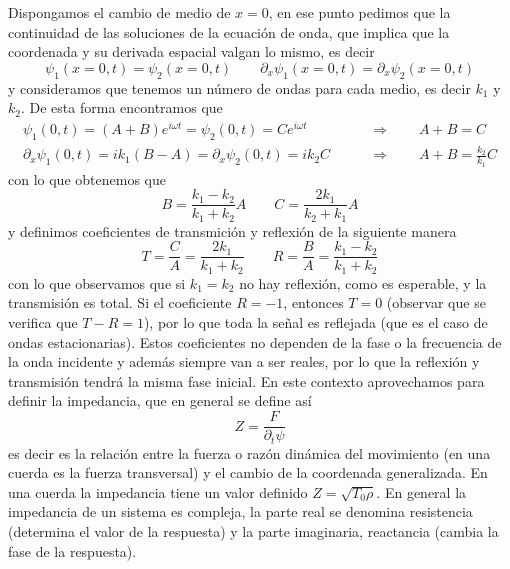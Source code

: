 \documentclass[a4paper]{article}
\numberwithin{equation}{section}
\begin{document}
			Dispongamos el cambio de medio de $x = 0$, en ese punto pedimos que la continuidad de las soluciones de la ecuación de onda, que implica que la coordenada y su derivada espacial valgan lo mismo, es decir
			\begin{equation*}
				\psi_1(x = 0,t) = \psi_2(x = 0,t) \qquad \partial_x \psi_1(x = 0,t) = \partial_x \psi_2(x = 0, t)
			\end{equation*}
			y consideramos que tenemos un número de ondas para cada medio, es decir $k_1$ y $k_2$. De esta forma encontramos que
			\begin{align*}
				\psi_1(0,t) = (A + B) e^{i\omega t} = \psi_2(0,t) = C e^{i\omega t} \qquad &\Rightarrow \qquad A + B = C\\
				\partial_x \psi_1(0,t) =  i k_1 (B - A) = \partial_x \psi_2(0,t) = i k_2 C \qquad &\Rightarrow \qquad A + B = \frac{k_2}{k_1} C
			\end{align*}
			con lo que obtenemos que
			\begin{equation}
				B = \frac{k_1 - k_2}{k_1 + k_2} A \qquad C = \frac{2 k_1}{k_2 + k_1} A
				\label{eq:ondas_reflexion_amplitudes}
			\end{equation}
			y definimos coeficientes de transmición y reflexión de la siguiente manera
			\begin{equation}
				T = \frac{C}{A} = \frac{2 k_1}{k_1 + k_2} \qquad R = \frac{B}{A} = \frac{k_1 - k_2}{k_1 + k_2}
				\label{eq:ondas_reflexion_coeficientes}
			\end{equation}
			con lo que observamos que si $k_1 = k_2$ no hay reflexión, como es esperable, y la transmisión es total. Si el coeficiente $R = -1$, entonces $T = 0$ (observar que se verifica que $T - R = 1$), por lo que toda la señal es reflejada (que es el caso de ondas estacionarias). Estos coeficientes no dependen de la fase o la frecuencia de la onda incidente y además siempre van a ser reales, por lo que la reflexión y transmisión tendrá la misma fase inicial.
			En este contexto aprovechamos para definir la impedancia, que en general se define así
			\begin{equation}
				Z = \frac{F}{\partial_t \psi}
				\label{eq:ondas_reflexion_impedancia}
			\end{equation}
			es decir es la relación entre la fuerza o razón dinámica del movimiento (en una cuerda es la fuerza transversal) y el cambio de la coordenada generalizada. En una cuerda la impedancia tiene un valor definido $Z = \sqrt{T_0 \rho}$. En general la impedancia de un sistema es compleja, la parte real se denomina resistencia (determina el valor de la respuesta) y la parte imaginaria, reactancia (cambia la fase de la respuesta).
			
\end{document}
